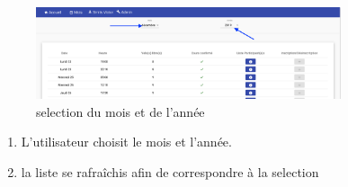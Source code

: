 \begin{figure}[h]
	\includegraphics[width = 0.8\textwidth,center]{Figures/us2-1}
	\caption{selection du mois et de l'année}
\end{figure}

\begin{enumerate}
	\item L'utilisateur choisit le mois et l'année. 
	\item la liste se rafraîchis afin de correspondre à la selection
\end{enumerate}